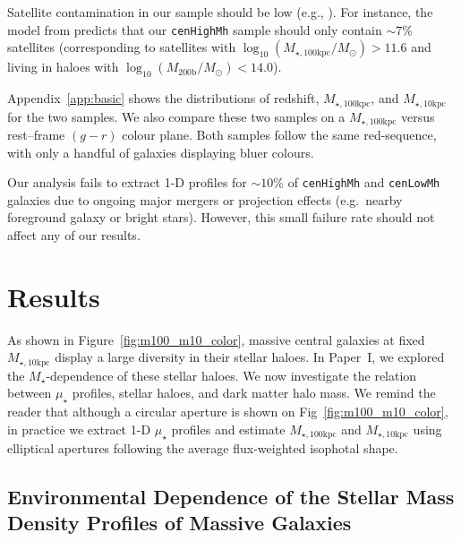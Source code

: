 \documentclass[a4paper,fleqn,usenatbib]{mnras}
\def\rbcg{\texttt{cenHighMh}}
\def\nbcg{\texttt{cenLowMh}}
\def\mstar{{$M_{\star}$}}
\def\logmh{{$\log_{10} (M_{\mathrm{200b}}/M_{\odot})$}}
\def\minn{{$M_{\star,10\mathrm{kpc}}$}}
\def\mtot{{$M_{\star,100\mathrm{kpc}}$}}
\def\logmtot{{$\log_{10} (M_{\star,100\mathrm{kpc}}/M_{\odot})$}}
\def\mden{{$\mu_{\star}$}}
\begin{document}
    Satellite contamination in our sample should be low (e.g., \citealt{Reid2014, Hoshino2015, Saito2016, vanUitert2016}). 
    For instance, the model from \citet{Saito2016} predicts that our \rbcg{} sample should only contain $\sim 7$\% satellites (corresponding to satellites with \logmtot{}$>11.6$ and living in haloes with \logmh$<14.0$).
    
    Appendix~\ref{app:basic} shows the distributions of redshift, \mtot{}, and 
    \minn{} for the two samples. 
    We also compare these two samples on a \mtot{} versus rest--frame $(g-r)$ colour 
    plane. 
    Both samples follow the same red-sequence, with only a handful of galaxies 
    displaying bluer colours.
    
    Our analysis fails to extract 1-D profiles for $\sim10$\% of 
    \rbcg{} and \nbcg{} galaxies due to ongoing major mergers or projection effects 
    (e.g.\ nearby foreground galaxy or bright stars). 
    However, this small failure rate should not affect any of our results.
    

\section{Results}
    \label{sec:result}
    
    As shown in Figure~\ref{fig:m100_m10_color}, massive central galaxies at fixed  
    \minn{} display a large diversity in their stellar haloes. 
    In Paper~I, we explored the \mstar{}-dependence of these stellar haloes. We now investigate the relation between \mden{} profiles, stellar haloes, and dark matter halo mass. We remind the reader that although a circular aperture is shown on 
    Fig~\ref{fig:m100_m10_color}, in practice we extract 1-D \mden{} profiles and 
    estimate \mtot{} and \minn{} using elliptical apertures following the average 
    flux-weighted isophotal shape. 

\subsection{Environmental Dependence of the Stellar Mass Density Profiles of Massive 
            Galaxies}
    \label{ssec:sbp_mtot} 
       
\end{document}
